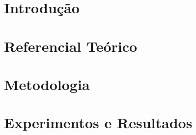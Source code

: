 \documentclass[
	12pt,				%
	openright,			%
	oneside,			%
	a4paper,			%
	chapter=TITLE,		%
	english,			%
	french,				%
	spanish,			%
	brazil				%
	]{abntex2}
\newif\ifisTipoDocumento
\begin{document}
\tableofcontents*
\cleardoublepage


\textual

\chapter[Introdução]{Introdução}



\chapter{Referencial Teórico}



\ifisTipoDocumento
    \chapter[Metodologia e etapas de desenvolvimento]{Metodologia e etapas de desenvolvimento}
    
\else
    \chapter[Metodologia]{Metodologia}
    
\fi


\ifisTipoDocumento
    \chapter[Alocação de Recursos]{Alocação de Recursos}
    
\else
    \chapter[Experimentos e Resultados]{Experimentos e Resultados}
    
\fi
\end{document}
